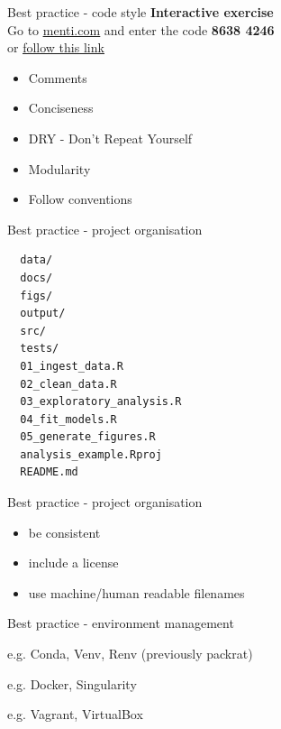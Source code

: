 \documentclass{beamer} %
\begin{document}
  \begin{frame}[label=BESTPRAC]{Best practice - code style}
    \textbf{Interactive exercise}
    \\
    Go to \href{https://www.menti.com/}{\underline{menti.com}} and enter the code \textbf{8638 4246}
    \\
    or \href{https://www.menti.com/turid6cc7u}{\underline{follow this link}}
    \vspace{0.5cm}
    \pause
    \begin{itemize}
      \item Comments
      \item Conciseness
      \item DRY - Don't Repeat Yourself
      \item Modularity
      \item Follow conventions
    \end{itemize}
  \end{frame}

  \begin{frame}[fragile]{Best practice - project organisation}
        \small
        \begin{verbatim}
  data/
  docs/
  figs/
  output/
  src/
  tests/
  01_ingest_data.R
  02_clean_data.R
  03_exploratory_analysis.R
  04_fit_models.R
  05_generate_figures.R
  analysis_example.Rproj
  README.md\end{verbatim}
  \end{frame}

  \begin{frame}{Best practice - project organisation}
    \begin{itemize}
      \item be consistent
      \item include a license
      \item use machine/human readable filenames
    \end{itemize}
  \end{frame}


  \begin{frame}{Best practice - environment management}
    \begin{tcolorbox}[skin=beamer,adjusted title=Virtual environments]
      e.g. Conda, Venv, Renv (previously packrat)
    \end{tcolorbox}
    \begin{tcolorbox}[skin=beamer,adjusted title=Containers]
      e.g. Docker, Singularity
    \end{tcolorbox}
    \begin{tcolorbox}[skin=beamer,adjusted title=Virtual Machines]
      e.g. Vagrant,  VirtualBox
    \end{tcolorbox}    
  \end{frame}
\end{document}
